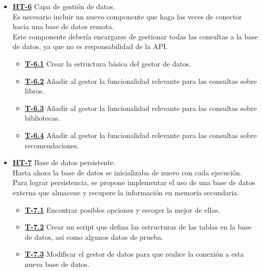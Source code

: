\begin{itemize}
    \item \href{https://github.com/Anglepi/My-Many-Reads/issues/76}{\textbf{HT-6}} Capa de gestión de datos. \\
    Es necesario incluir un nuevo componente que haga las veces de conector hacia una base de datos remota. \\
    Este componente debería encargarse de gestionar todas las consultas a la base de datos, ya que no es responsabilidad de la API.
    \begin{itemize}
        \item \href{https://github.com/Anglepi/My-Many-Reads/issues/77}{\textbf{T-6.1}} Crear la estructura básica del gestor de datos.
        \item \href{https://github.com/Anglepi/My-Many-Reads/issues/78}{\textbf{T-6.2}} Añadir al gestor la funcionalidad relevante para las consultas sobre libros.
        \item \href{https://github.com/Anglepi/My-Many-Reads/issues/79}{\textbf{T-6.3}} Añadir al gestor la funcionalidad relevante para las consultas sobre bibliotecas.
        \item \href{https://github.com/Anglepi/My-Many-Reads/issues/80}{\textbf{T-6.4}} Añadir al gestor la funcionalidad relevante para las consultas sobre recomendaciones.
    \end{itemize}
    \item \href{https://github.com/Anglepi/My-Many-Reads/issues/76}{\textbf{HT-7}} Base de datos persistente. \\
    Hasta ahora la base de datos se inicializaba de nuevo con cada ejecución. \\
    Para lograr persistencia, se propone implementar el uso de una base de datos externa que almacene y recupere la información en memoria secundaria.
    \begin{itemize}
        \item \href{https://github.com/Anglepi/My-Many-Reads/issues/77}{\textbf{T-7.1}} Encontrar posibles opciones y escoger la mejor de ellas.
        \item \href{https://github.com/Anglepi/My-Many-Reads/issues/78}{\textbf{T-7.2}} Crear un script que defina las estructuras de las tablas en la base de datos, así como algunos datos de prueba.
        \item \href{https://github.com/Anglepi/My-Many-Reads/issues/79}{\textbf{T-7.3}} Modificar el gestor de datos para que realice la conexión a esta nueva base de datos.

\end{itemize}
\end{itemize}
